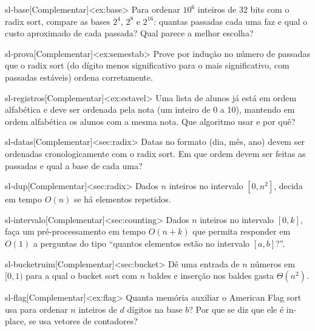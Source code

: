 \begin{exercicio}{sl-base}[Complementar]<ex:base>
Para ordenar $10^6$ inteiros de 32 bits com o radix sort, compare as bases $2^4$, $2^8$ e $2^{16}$: quantas passadas cada uma faz e qual o custo aproximado de cada passada? Qual parece a melhor escolha?
\end{exercicio}
\begin{exercicio}{sl-prova}[Complementar]<ex:semestab>
Prove por indução no número de passadas que o radix sort (do dígito menos significativo para o mais significativo, com passadas estáveis) ordena corretamente.
\end{exercicio}
\begin{exercicio}{sl-registros}[Complementar]<ex:estavel>
Uma lista de alunos já está em ordem alfabética e deve ser ordenada pela nota (um inteiro de 0 a 10), mantendo em ordem alfabética os alunos com a mesma nota. Que algoritmo usar e por quê?
\end{exercicio}
\begin{exercicio}{sl-datas}[Complementar]<sec:radix>
Datas no formato (dia, mês, ano) devem ser ordenadas cronologicamente com o radix sort. Em que ordem devem ser feitas as passadas e qual a base de cada uma?
\end{exercicio}
\begin{exercicio}{sl-dup}[Complementar]<sec:radix>
Dados $n$ inteiros no intervalo $[0,n^2]$, decida em tempo $O(n)$ se há elementos repetidos.
\end{exercicio}
\begin{exercicio}{sl-intervalo}[Complementar]<sec:counting>
Dados $n$ inteiros no intervalo $[0,k]$, faça um pré-processamento em tempo $O(n+k)$ que permita responder em $O(1)$ a perguntas do tipo ``quantos elementos estão no intervalo $[a,b]$?''.
\end{exercicio}
\begin{exercicio}{sl-bucketruim}[Complementar]<sec:bucket>
Dê uma entrada de $n$ números em $[0,1)$ para a qual o bucket sort com $n$ baldes e inserção nos baldes gasta $\Theta(n^2)$.
\end{exercicio}
\begin{exercicio}{sl-flag}[Complementar]<ex:flag>
Quanta memória auxiliar o American Flag sort usa para ordenar $n$ inteiros de $d$ dígitos na base $b$? Por que se diz que ele é in-place, se usa vetores de contadores?
\end{exercicio}
